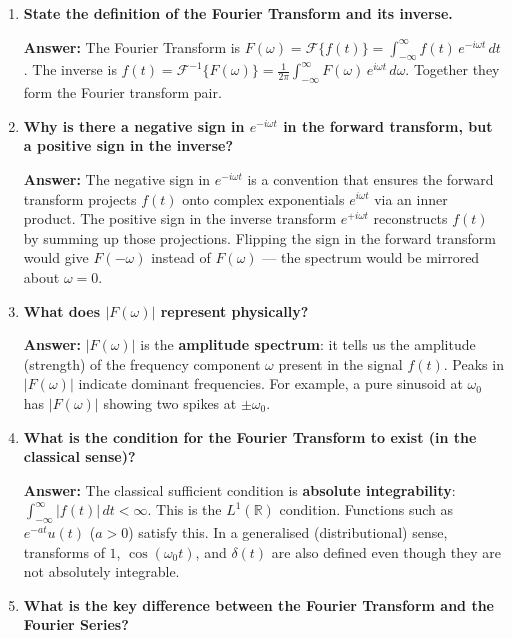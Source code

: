\documentclass[12pt,a4paper]{article}
\begin{document}
\begin{enumerate}[label=\textbf{Q\arabic*.}, leftmargin=2.5em]

\item \textbf{State the definition of the Fourier Transform and its inverse.}

\textbf{Answer:}
The Fourier Transform is
$F(\omega) = \mathcal{F}\{f(t)\} = \int_{-\infty}^{\infty} f(t)\,e^{-i\omega t}\,dt$.
The inverse is
$f(t) = \mathcal{F}^{-1}\{F(\omega)\} = \frac{1}{2\pi}\int_{-\infty}^{\infty}F(\omega)\,e^{i\omega t}\,d\omega$.
Together they form the Fourier transform pair.

\item \textbf{Why is there a negative sign in $e^{-i\omega t}$ in the forward transform, but a positive sign in the inverse?}

\textbf{Answer:}
The negative sign in $e^{-i\omega t}$ is a convention that ensures the forward transform projects $f(t)$
onto complex exponentials $e^{i\omega t}$ via an inner product.
The positive sign in the inverse transform $e^{+i\omega t}$ reconstructs $f(t)$ by summing up those projections.
Flipping the sign in the forward transform would give $F(-\omega)$ instead of $F(\omega)$ ---
the spectrum would be mirrored about $\omega = 0$.

\item \textbf{What does $|F(\omega)|$ represent physically?}

\textbf{Answer:}
$|F(\omega)|$ is the \textbf{amplitude spectrum}: it tells us the amplitude (strength) of the
frequency component $\omega$ present in the signal $f(t)$.
Peaks in $|F(\omega)|$ indicate dominant frequencies.
For example, a pure sinusoid at $\omega_0$ has $|F(\omega)|$ showing two spikes at $\pm\omega_0$.

\item \textbf{What is the condition for the Fourier Transform to exist (in the classical sense)?}

\textbf{Answer:}
The classical sufficient condition is \textbf{absolute integrability}:
$\int_{-\infty}^{\infty}|f(t)|\,dt < \infty$.
This is the $L^1(\mathbb{R})$ condition.
Functions such as $e^{-at}u(t)$ ($a>0$) satisfy this.
In a generalised (distributional) sense, transforms of $1$, $\cos(\omega_0 t)$, and $\delta(t)$
are also defined even though they are not absolutely integrable.

\item \textbf{What is the key difference between the Fourier Transform and the Fourier Series?}


\end{enumerate}
\end{document}
